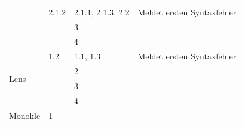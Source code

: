 \begin{table}[htp]
\begin{tabularx}{\columnwidth}{lXXl}
                                                                                  & 2.1.2                                                                       & 2.1.1, 2.1.3, 2.2                                                                           & Meldet ersten Syntaxfehler                              \\
                                                                                  &                                                                             & 3                                                                                           &                                                         \\
                                                                                  &                                                                             & 4                                                                                           &                                                         \\
    \midrule
    \multirow{4}{*}{Lens}                                                         & 1.2                                                                         & 1.1, 1.3                                                                                    & Meldet ersten Syntaxfehler                              \\
                                                                                  &                                                                             & 2                                                                                           &                                                         \\
                                                                                  &                                                                             & 3                                                                                           &                                                         \\
                                                                                  &                                                                             & 4                                                                                           &                                                         \\
    \midrule
    \multirow{4}{*}{Monokle}                                                      & 1                                                                           &                                                                                             &                                                         \\

\end{tabularx}
\end{table}
